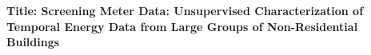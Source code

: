 \textbf{Title: Screening Meter Data: Unsupervised Characterization of Temporal Energy Data from Large Groups of Non-Residential Buildings}
